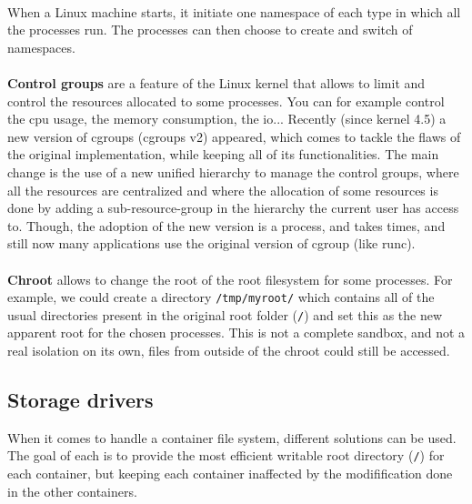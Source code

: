 \paragraph{}When a Linux machine starts, it initiate one namespace of each type in which all the processes run.  The processes can then choose to create and switch of namespaces.

\paragraph{}\textbf{Control groups} are a feature of the Linux kernel that allows to limit and control the resources allocated to some processes.  You can for example control the cpu usage, the memory consumption, the io...  Recently (since kernel 4.5) a new version of cgroups (cgroups v2) appeared, which comes to tackle the flaws of the original implementation, while keeping all of its functionalities.  The main change is the use of a new unified hierarchy to manage the control groups, where all the resources are centralized and where the allocation of some resources is done by adding a sub-resource-group in the hierarchy the current user has access to.
Though, the adoption of the new version is a process, and takes times, and still now many applications use the original version of cgroup (like runc).

\paragraph{}\textbf{Chroot} allows to change the root of the root filesystem for some processes.  For example, we could create a directory \texttt{/tmp/myroot/} which contains all of the usual directories present in the original root folder (\texttt{/}) and set this as the new apparent root for the chosen processes.  This is not a complete sandbox, and not a real isolation on its own, files from outside of the chroot could still be accessed.

\subsection{Storage drivers}
When it comes to handle a container file system, different solutions can be used.  The goal of each is to provide the most efficient writable root directory (\texttt{/}) for each container, but keeping each container inaffected by the modifification done in the other containers.

